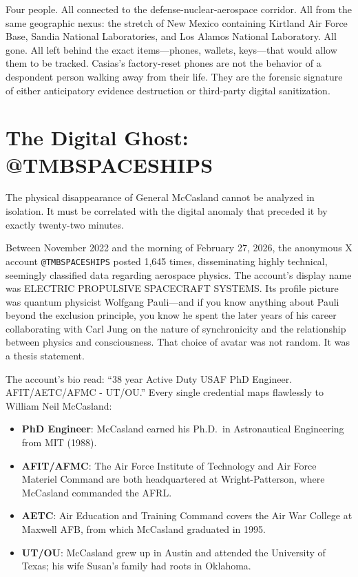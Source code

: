 \documentclass[11pt,a4paper]{article}
\begin{document}
Four people. All connected to the defense-nuclear-aerospace corridor. All from the same geographic nexus: the stretch of New Mexico containing Kirtland Air Force Base, Sandia National Laboratories, and Los Alamos National Laboratory. All gone. All left behind the exact items---phones, wallets, keys---that would allow them to be tracked. Casias's factory-reset phones are not the behavior of a despondent person walking away from their life. They are the forensic signature of either anticipatory evidence destruction or third-party digital sanitization.

\section{The Digital Ghost: @TMBSPACESHIPS}

The physical disappearance of General McCasland cannot be analyzed in isolation. It must be correlated with the digital anomaly that preceded it by exactly twenty-two minutes.

Between November 2022 and the morning of February 27, 2026, the anonymous X account \texttt{@TMBSPACESHIPS} posted 1,645 times, disseminating highly technical, seemingly classified data regarding aerospace physics. The account's display name was ELECTRIC PROPULSIVE SPACECRAFT SYSTEMS. Its profile picture was quantum physicist Wolfgang Pauli---and if you know anything about Pauli beyond the exclusion principle, you know he spent the later years of his career collaborating with Carl Jung on the nature of synchronicity and the relationship between physics and consciousness. That choice of avatar was not random. It was a thesis statement.

The account's bio read: ``38 year Active Duty USAF PhD Engineer. AFIT/AETC/AFMC - UT/OU.'' Every single credential maps flawlessly to William Neil McCasland:

\begin{itemize}[nosep]
    \item \textbf{PhD Engineer}: McCasland earned his Ph.D.\ in Astronautical Engineering from MIT (1988).
    \item \textbf{AFIT/AFMC}: The Air Force Institute of Technology and Air Force Materiel Command are both headquartered at Wright-Patterson, where McCasland commanded the AFRL.
    \item \textbf{AETC}: Air Education and Training Command covers the Air War College at Maxwell AFB, from which McCasland graduated in 1995.
    \item \textbf{UT/OU}: McCasland grew up in Austin and attended the University of Texas; his wife Susan's family had roots in Oklahoma.
\end{itemize}
\end{document}
